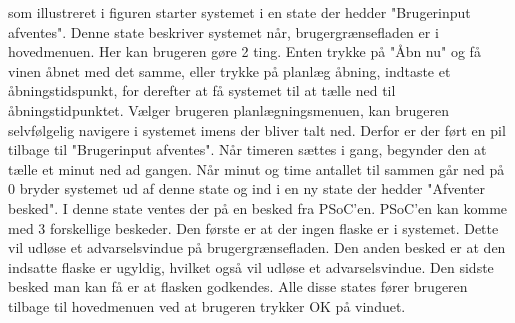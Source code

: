 som illustreret i figuren starter systemet i en state der hedder "Brugerinput afventes". Denne state beskriver systemet når, brugergrænsefladen er i hovedmenuen. Her kan brugeren gøre 2 ting. Enten trykke på "Åbn nu" og få vinen åbnet med det samme, eller trykke på planlæg åbning, indtaste et åbningstidspunkt, for derefter at få systemet til at tælle ned til åbningstidpunktet. Vælger brugeren planlægningsmenuen, kan brugeren selvfølgelig navigere i systemet imens der bliver talt ned. Derfor er der ført en pil tilbage til "Brugerinput afventes". Når timeren sættes i gang, begynder den at tælle et minut ned ad gangen. Når minut og time antallet til sammen går ned på 0 bryder systemet ud af denne state og ind i en ny state der hedder "Afventer besked". I denne state ventes der på en besked fra PSoC'en. PSoC'en kan komme med 3 forskellige beskeder. Den første er at der ingen flaske er i systemet. Dette vil udløse et advarselsvindue på brugergrænsefladen. Den anden besked er at den indsatte flaske er ugyldig, hvilket også vil udløse et advarselsvindue. Den sidste besked man kan få er at flasken godkendes. Alle disse states fører brugeren tilbage til hovedmenuen ved at brugeren trykker OK på vinduet.
